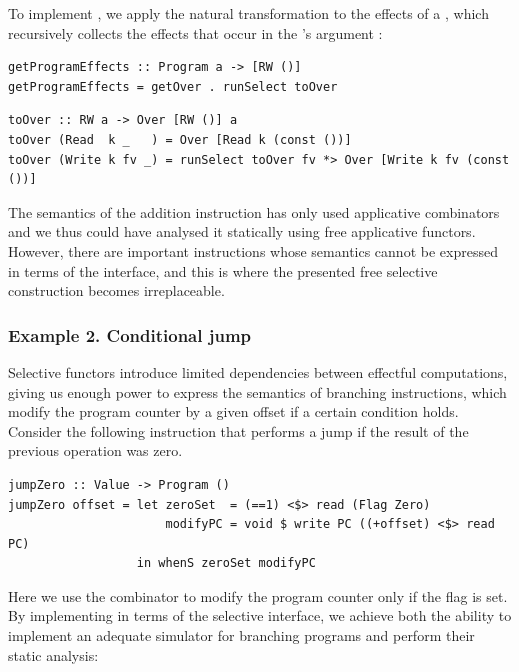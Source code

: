 \noindent
To implement , we apply the natural transformation
 to the effects of a , which recursively collects the
effects that occur in the 's argument :

\vspace{1mm}
\begin{verbatim}
getProgramEffects :: Program a -> [RW ()]
getProgramEffects = getOver . runSelect toOver
\end{verbatim}
\vspace{1mm}
\begin{verbatim}
toOver :: RW a -> Over [RW ()] a
toOver (Read  k _   ) = Over [Read k (const ())]
toOver (Write k fv _) = runSelect toOver fv *> Over [Write k fv (const ())]
\end{verbatim}
\vspace{1mm}

\noindent
The semantics of the addition instruction has only used applicative combinators
and we thus could have analysed it statically using free applicative functors.
However, there are important instructions whose semantics cannot be expressed
in terms of the  interface, and this is where the presented
free selective construction becomes irreplaceable.

\subsubsection{Example 2. Conditional jump}

Selective functors introduce limited dependencies between effectful
computations, giving us enough power to express the semantics of branching
instructions, which modify the program counter by a given offset if a certain
condition holds. Consider the following instruction that performs a jump if the
result of the previous operation was zero.

\vspace{1mm}
\begin{verbatim}
jumpZero :: Value -> Program ()
jumpZero offset = let zeroSet  = (==1) <$> read (Flag Zero)
                      modifyPC = void $ write PC ((+offset) <$> read PC)
                  in whenS zeroSet modifyPC
\end{verbatim}
\vspace{1mm}

\noindent
Here we use the  combinator to modify the program counter only if
the  flag is set. By implementing  in terms of the
selective interface, we achieve both the ability to implement an adequate
simulator for branching programs and perform their static analysis:


